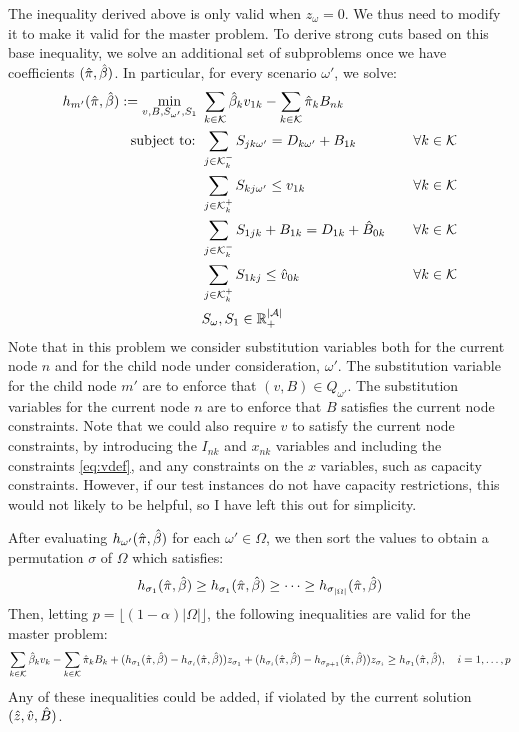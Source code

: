\documentclass[10pt]{article}
\newcommand{\ka}{k} %
\newcommand{\KA}{\mathcal{K}}
\newcommand{\jey}{j} %
\newcommand{\Graf}{\mathcal{A}} %
\newcommand{\Bi}{B} %
\newcommand{\Vi}{v} %
\newcommand{\Es}{S} %
\newcommand{\Zed}{z} %
\newcommand{\m}{\omega} %
\newcommand{\EM}{\Omega} %
\newcommand{\x}{x} %
\newcommand{\Csub}{\mathcal{K}^+_k}
\newcommand{\Psub}{\mathcal{K}^-_k}
\begin{document}
The inequality derived above is only valid when $\Zed_\m = 0$. We thus need to modify it to make it valid for the master problem.
To derive strong cuts based on this base inequality, we solve an additional set of subproblems once we have coefficients $(\hat{\pi},\hat{\beta})$. In particular, for every scenario $\m'$, we solve:
\begin{align*}
h_{m'}(\pisol,\betasol) := \min_{v,B,\Es_{\m'},\Es_1} \ & \sum_{\ka  \in \KA} \betasol_\ka \Vi_{1 \ka} - \sum_{\ka  \in \KA} \pisol_k \Bi_{n  \ka} \\
\text{subject to: } &  \sum_{\jey \in  \Psub} \Es_{\jey \ka \m'} = D_{\ka \m'} + \Bi_{1  \ka} \ &\forall \ka  \in \KA  \\
    &\sum_{\jey \in  \Csub} \Es_{\ka \jey \m'} \leq \Vi_{1 \ka} \ &\forall \ka  \in \KA \\
    & \sum_{\jey \in  \Psub} {S}_{1 \jey \ka} + \Bi_{1  \ka}  = D_{1 \ka} + \hat{\Bi}_{0 \ka} \quad &\forall \ka  \in \KA \\
    & \sum_{\jey \in  \Csub} {S}_{1 \ka \jey} \leq \hat{\Vi}_{0 \ka}  \quad &\forall \ka  \in \KA\\
    & \Es_\m , \Es_1 \in \mathbb{R}_+^{|\Graf|}
\end{align*}
Note that in this problem we consider substitution variables both for the current node $n$ and for the child node under consideration, $\m'$. The substitution variable for the child node $m'$ are to enforce that $(v,B) \in Q_{\m'}$. The substitution variables for the current node $n$ are to enforce that $B$ satisfies the current node constraints. Note that we could also require $v$ to satisfy the current node constraints, by introducing the $I_{n \ka}$ and $\x_{n \ka}$ variables and including the constraints \eqref{eq:vdef}, and any constraints on the $x$ variables, such as capacity constraints. However, if our test instances do not have capacity restrictions, this would not likely to be helpful, so I have left this out for simplicity.

After evaluating $h_{\m'}(\pisol,\betasol)$ for each $\m' \in \EM$, we then sort the values to obtain a permutation $\sigma$ of $\EM$ which satisfies:
\[ h_{\sigma_1}(\pisol,\betasol) \geq h_{\sigma_1}(\pisol,\betasol)  \geq \cdots \geq h_{\sigma_{|\EM|}}(\pisol,\betasol)
 \]
Then, letting $p = \lfloor (1-\alpha) |\EM| \rfloor$, the following inequalities are valid for the master problem:
\[ \sum_{\ka  \in \KA} \betasol_k \Vi_k - \sum_{\ka  \in \KA} \pisol_k \Bi_k + 
(h_{\sigma_1}(\pisol,\betasol) - h_{\sigma_i}(\pisol,\betasol))\Zed_{\sigma_1} + 
(h_{\sigma_i}(\pisol,\betasol) - h_{\sigma_{p+1}}(\pisol,\betasol))\Zed_{\sigma_i} \geq h_{\sigma_1}(\pisol,\betasol), \quad i=1,\ldots, p \]
Any of these inequalities could be added, if violated by the current solution $(\zsol,\vsol,\bsol)$.
\end{document}
